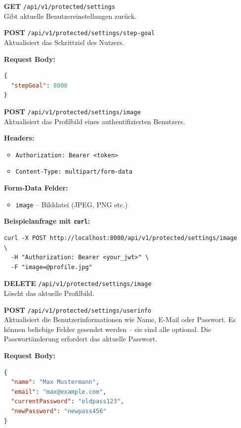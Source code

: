 \documentclass[11pt,a4paper]{article}
\begin{document}
\begin{itemize}[leftmargin=1.5cm]
    \item[\textbf{GET}] \texttt{/api/v1/protected/settings} \\
    Gibt aktuelle Benutzereinstellungen zurück.

    \item[\textbf{POST}] \texttt{/api/v1/protected/settings/step-goal} \\
    Aktualisiert das Schrittziel des Nutzers.

    \textbf{Request Body:}
    \begin{lstlisting}[language=json]
{
  "stepGoal": 8000
}
    \end{lstlisting}

    \item[\textbf{POST}] \texttt{/api/v1/protected/settings/image} \\
    Aktualisiert das Profilbild eines authentifizierten Benutzers.

    \textbf{Headers:}
    \begin{itemize}
        \item \texttt{Authorization: Bearer <token>}
        \item \texttt{Content-Type: multipart/form-data}
    \end{itemize}

    \textbf{Form-Data Felder:}
    \begin{itemize}
        \item \texttt{image} -- Bilddatei (JPEG, PNG etc.)
    \end{itemize}

    \textbf{Beispielanfrage mit \texttt{curl}:}
    \begin{lstlisting}
curl -X POST http://localhost:8080/api/v1/protected/settings/image \
  -H "Authorization: Bearer <your_jwt>" \
  -F "image=@profile.jpg"
    \end{lstlisting}

    \item[\textbf{DELETE}] \texttt{/api/v1/protected/settings/image} \\
    Löscht das aktuelle Profilbild.

    \item[\textbf{POST}] \texttt{/api/v1/protected/settings/userinfo} \\
    Aktualisiert die Benutzerinformationen wie Name, E-Mail oder Passwort. Es können beliebige Felder gesendet werden – sie sind alle optional. Die Passwortänderung erfordert das aktuelle Passwort.

    \textbf{Request Body:}
    \begin{lstlisting}[language=json]
{
  "name": "Max Mustermann",
  "email": "max@example.com",
  "currentPassword": "oldpass123",
  "newPassword": "newpass456"
}
    \end{lstlisting}
\end{itemize}
\end{document}
